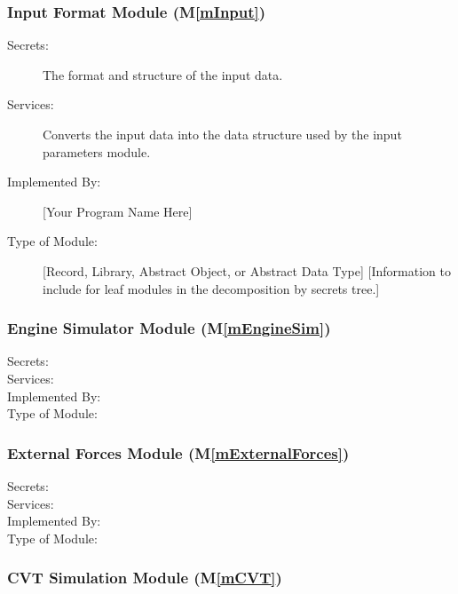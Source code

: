 \documentclass[12pt, titlepage]{article}
\newcommand{\mref}[1]{M\ref{#1}}
\begin{document}
\subsubsection{Input Format Module (\mref{mInput})}

\begin{description}
\item[Secrets:]The format and structure of the input data.
\item[Services:]Converts the input data into the data structure used by the
  input parameters module.
\item[Implemented By:] [Your Program Name Here]
\item[Type of Module:] [Record, Library, Abstract Object, or Abstract Data Type]
  [Information to include for leaf modules in the decomposition by secrets tree.]
\end{description}

\subsubsection{Engine Simulator Module (\mref{mEngineSim})}

\begin{description}
\item[Secrets:]
\item[Services:]
\item[Implemented By:]
\item[Type of Module:] 
  
\end{description}

\subsubsection{External Forces Module (\mref{mExternalForces})}

\begin{description}
\item[Secrets:]
\item[Services:]
\item[Implemented By:]
\item[Type of Module:] 
  
\end{description}

\subsubsection{CVT Simulation Module (\mref{mCVT})}
\end{document}
